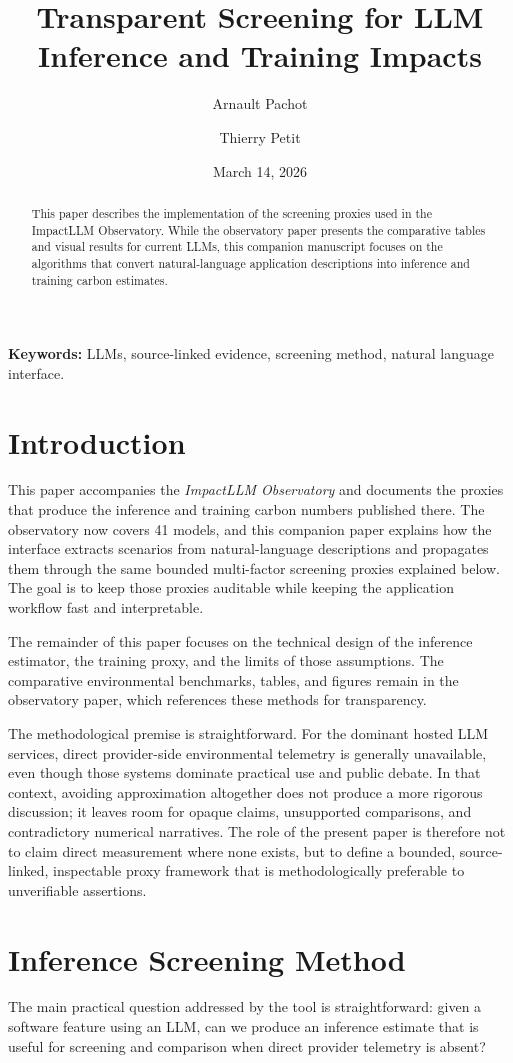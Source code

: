\documentclass[10pt,a4paper]{article}
\title{Transparent Screening for LLM Inference and Training Impacts}
\author{Arnault Pachot \and Thierry Petit}
\date{March 14, 2026}
\begin{document}
\maketitle

\begin{abstract}
This paper describes the implementation of the screening proxies used in the ImpactLLM Observatory. While the observatory paper presents the comparative tables and visual results for current LLMs, this companion manuscript focuses on the algorithms that convert natural-language application descriptions into inference and training carbon estimates.
\end{abstract}

\textbf{Keywords:} LLMs, source-linked evidence, screening method, natural language interface.
\section{Introduction}
This paper accompanies the \emph{ImpactLLM Observatory} and documents the proxies that produce the inference and training carbon numbers published there. The observatory now covers 41 models, and this companion paper explains how the interface extracts scenarios from natural-language descriptions and propagates them through the same bounded multi-factor screening proxies explained below. The goal is to keep those proxies auditable while keeping the application workflow fast and interpretable.

The remainder of this paper focuses on the technical design of the inference estimator, the training proxy, and the limits of those assumptions. The comparative environmental benchmarks, tables, and figures remain in the observatory paper, which references these methods for transparency.

The methodological premise is straightforward. For the dominant hosted LLM services, direct provider-side environmental telemetry is generally unavailable, even though those systems dominate practical use and public debate. In that context, avoiding approximation altogether does not produce a more rigorous discussion; it leaves room for opaque claims, unsupported comparisons, and contradictory numerical narratives. The role of the present paper is therefore not to claim direct measurement where none exists, but to define a bounded, source-linked, inspectable proxy framework that is methodologically preferable to unverifiable assertions.


\section{Inference Screening Method}
The main practical question addressed by the tool is straightforward: given a software feature using an LLM, can we produce an inference estimate that is useful for screening and comparison when direct provider telemetry is absent?
\end{document}
